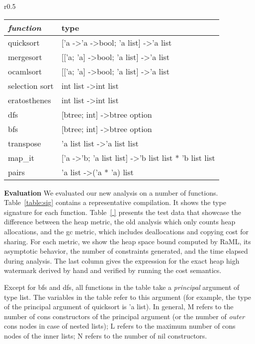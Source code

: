 \documentclass{easychair}
\theoremstyle{definition}
\begin{document}
\label{sect:evaluation}
\begin{wraptable}{r}{0.5\textwidth}
\small
	\vspace{-20pt}
		\begin{center}
	\begin{tabular}{ll}
		\hline
		\textit{\textbf{function}} & type \\ \hline
		quicksort & {[}'a -\textgreater 'a -\textgreater bool; 'a list{]} -\textgreater 'a list \\
		mergesort & {[}{[}'a; 'a{]} -\textgreater bool; 'a list{]} -\textgreater 'a list \\
		ocamlsort & {[}{[}'a; 'a{]} -\textgreater bool; 'a list{]} -\textgreater 'a list \\
		selection sort & int list -\textgreater int list \\
		eratosthenes & int list -\textgreater int list \\
		dfs & {[}btree; int{]} -\textgreater btree option \\
		bfs & {[}btree; int{]} -\textgreater btree option \\
		transpose & 'a list list -\textgreater 'a list list \\
		map\_it & {[}'a -\textgreater 'b; 'a list list{]} -\textgreater 'b list list * 'b list list\\
		pairs & 'a list -\textgreater ('a * 'a) list \\ \hline
	\end{tabular}
			\end{center}
				\vspace{-10pt}
			\caption{Signature of Test Functions}
		\vspace{-10pt}
\label{table:sig}
\end{wraptable}

\textbf{Evaluation}
We evaluated our new analysis on a number of functions. Table~\ref{table:sig} contains a representative compilation.
It shows the type signature for each function. Table~\ref{ } presents the test 
data that
showcase the difference between the heap metric, the old analysis which only counts 
heap allocations, and the gc metric, which includes deallocations and copying cost for sharing.
For each metric, we show the heap space bound computed by RaML, its asymptotic behavior, 
the number of constraints generated, and the time elapsed during analysis. The last column gives
the expression for the exact heap high watermark derived by hand and verified by running the 
cost semantics.

Except for bfs and dfs, all functions in the table take a \emph{principal} argument of type list. 
The variables in the table refer to this argument (for example, the type of the 
principal argument of 
quicksort is 'a list). In general, M refers to the number of cons constructors of the principal 
argument (or the number of \emph{outer} cons nodes in case of nested lists); L refers to the
maximum number of cons nodes of the inner lists; N refers to the number of nil constructors.
\end{document}

